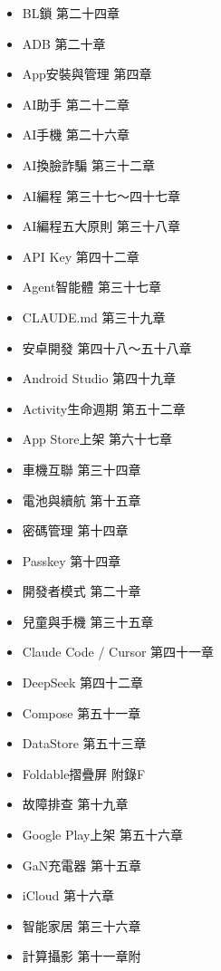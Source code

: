 


\begin{itemize}
  \item BL鎖 第二十四章
  \item ADB 第二十章
  \item App安裝與管理 第四章
  \item AI助手 第二十二章
  \item AI手機 第二十六章
  \item AI換臉詐騙 第三十二章
  \item AI編程 第三十七～四十七章
  \item AI編程五大原則 第三十八章
  \item API Key 第四十二章
  \item Agent智能體 第三十七章
  \item CLAUDE.md 第三十九章
  \item 安卓開發 第四十八～五十八章
  \item Android Studio 第四十九章
  \item Activity生命週期 第五十二章
  \item App Store上架 第六十七章
\end{itemize}


\begin{itemize}
  \item 車機互聯 第三十四章
  \item 電池與續航 第十五章
  \item 密碼管理 第十四章
  \item Passkey 第十四章
  \item 開發者模式 第二十章
  \item 兒童與手機 第三十五章
  \item Claude Code / Cursor 第四十一章
  \item DeepSeek 第四十二章
  \item Compose 第五十一章
  \item DataStore 第五十三章
\end{itemize}


\begin{itemize}
  \item Foldable摺疊屏 附錄F
  \item 故障排查 第十九章
  \item Google Play上架 第五十六章
  \item GaN充電器 第十五章
  \item iCloud 第十六章
  \item 智能家居 第三十六章
  \item 計算攝影 第十一章附
\end{itemize}

